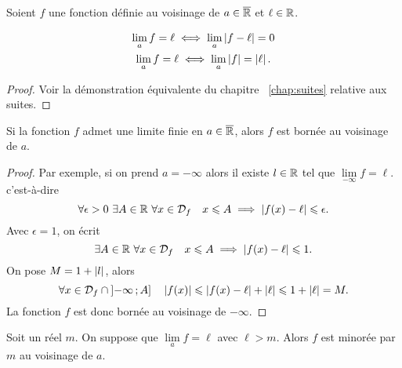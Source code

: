 Soient \(f\) une fonction définie au voisinage de \(a \in \overline{\mathbb{R}}\) et \(\ell \in 
\mathbb{R}\).
\begin{prop}
  \begin{gather}
    \lim\limits_{a} f = \ell \iff \lim\limits_{a} \left\lvert f-\ell\right\rvert = 0 \\ 
    \lim\limits_{a} f = \ell \iff \lim\limits_{a} \left\lvert f\right\rvert=\left\lvert\ell\right\rvert.
  \end{gather}
\end{prop}
\begin{proof}
  Voir la démonstration équivalente du chapitre~
  \ref{chap:suites} relative aux suites.
\end{proof}
\begin{prop}
  Si la fonction \(f\) admet une limite finie en \(a \in \overline{\mathbb{R}}\), alors \(f\) 
  est bornée au voisinage de \(a\).
\end{prop}
\begin{proof}
  Par exemple, si on prend \(a=-\infty\) alors il existe \(l \in \mathbb{R}\) tel que 
  \(\lim\limits_{-\infty} f = \ell\). c'est-à-dire
  \begin{equation}
    \forall \epsilon >0 \ \exists A \in \R \ \forall x \in \Def{f} \quad x 
    \leqslant A \implies \abs{f(x)-\ell} \leqslant \epsilon.
  \end{equation}
  Avec \(\epsilon=1\), on écrit
  \begin{equation}
    \exists A \in \mathbb{R} \ \forall x \in \mathcal{D}_{f} \quad x \leqslant A \implies 
    \left\lvert f(x)-\ell\right\rvert \leqslant 1.
  \end{equation}
  On pose \(M=1+\left\lvert l\right\rvert\), alors
  \begin{equation}
    \forall x \in \mathcal{D}_{f} \cap \left] -\infty \, ;  A \right] \quad \left\lvert f(x)\right\rvert 
    \leqslant \left\lvert f(x)-\ell\right\rvert+\left\lvert\ell\right\rvert \leqslant 1+\left\lvert\ell\right\rvert=M.
  \end{equation}
  La fonction \(f\) est donc bornée au voisinage de \(-\infty\).
\end{proof}
\begin{prop}
  Soit un réel \(m\). On suppose que \(\lim\limits_{a} f=\ell\) avec \(\ell>m\). 
  Alors \(f\) est minorée par \(m\) au voisinage de \(a\).
\end{prop}
